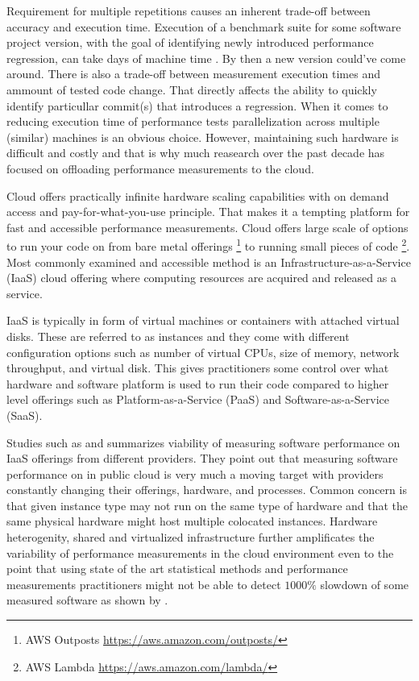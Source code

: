Requirement for multiple repetitions causes an inherent trade-off between accuracy and execution time.
Execution of a benchmark suite for some software project version, with the goal of identifying newly introduced performance regression, can take days of machine time .
By then a new version could've come around.
There is also a trade-off between measurement execution times and ammount of tested code change.
That directly affects the ability to quickly identify particullar commit(s) that introduces a regression.
When it comes to reducing execution time of performance tests parallelization across multiple (similar) machines is an obvious choice.
However, maintaining such hardware is difficult and costly  and that is why much reasearch over the past decade \cite{leitner2016patterns} \cite{laaber2019software} \cite{abedi2017conducting} has focused on offloading performance measurements to the cloud.

Cloud offers practically infinite hardware scaling capabilities with on demand access and pay-for-what-you-use principle.
That makes it a tempting platform for fast and accessible performance measurements.
Cloud offers large scale of options to run your code on from bare metal offerings \footnote{AWS Outposts \url{https://aws.amazon.com/outposts/}} to running small pieces of code \footnote{AWS Lambda \url{https://aws.amazon.com/lambda/}}.
Most commonly examined and accessible method is an Infrastructure-as-a-Service (IaaS) cloud offering where computing resources are acquired and released as a service.

IaaS is typically in form of virtual machines or containers with attached virtual disks.
These are referred to as instances and they come with different configuration options such as number of virtual CPUs, size of memory, network throughput, and virtual disk.
This gives practitioners some control over what hardware and software platform is used to run their code compared to higher level offerings such as Platform-as-a-Service (PaaS) and Software-as-a-Service (SaaS).

Studies such as \citet{leitner2016patterns} and \citet{laaber2019software} summarizes viability of measuring software performance on IaaS offerings from different providers.
They point out that measuring software performance on in public cloud is very much a moving target with providers constantly changing their offerings, hardware, and processes.
Common concern is that given instance type may not run on the same type of hardware and that the same physical hardware might host multiple colocated instances.
Hardware heterogenity, shared and virtualized infrastructure further amplificates the variability of performance measurements in the cloud environment \cite{leitner2016patterns} even to the point that using state of the art statistical methods and performance measurements practitioners might not be able to detect $1000\%$ slowdown of some measured software as shown by \citet{laaber2019software}.

